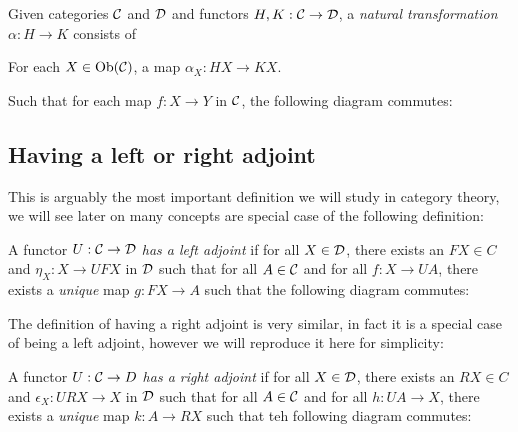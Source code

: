 \begin{defin}
    Given categories $\mathcal{C}$ and $\mathcal{D}$ and functors $H, K : \mathcal{C} \to \mathcal{D}$, a \emph{natural transformation} $\alpha : H \to K$ consists of
    \begin{itemize}
        For each $X\in \text{Ob}(\mathcal{C})$, a map $\alpha_X : H X \to K X$.
    \end{itemize}
    Such that for each map $f : X \to Y$ in $\mathcal{C}$, the following diagram commutes:
    \begin{center}
    \end{center}
\end{defin}

\subsection{Having a left or right adjoint}

This is arguably the most important definition we will study in category theory, we will see later on many concepts are special case of the following definition:

\begin{defin}
    A functor $U : \mathcal{C} \to \mathcal{D}$ \emph{has a left adjoint} if for all $X \in \mathcal{D}$, there exists an $FX \in C$ and $\eta_X : X \to UFX$ in $\mathcal{D}$ such that for all $A \in \mathcal{C}$ and for all $f : X \to UA$, there exists a \emph{unique} map $g : FX \to A$ such that the following diagram commutes:
    \begin{center}
    \end{center}
\end{defin}

The definition of having a right adjoint is very similar, in fact it is a special case of being a left adjoint, however we will reproduce it here for simplicity:

\begin{defin}
    A functor $U : \mathcal{C} \to D$ \emph{has a right adjoint} if for all $X \in \mathcal{D}$, there exists an $R X \in C$ and $\epsilon_X : URX \to X$ in $\mathcal{D}$ such that for all $A \in \mathcal{C}$ and for all $h : UA \to X$, there exists a \emph{unique} map $k : A \to RX$ such that teh following diagram commutes:
    \begin{center}
    \end{center}
\end{defin}

